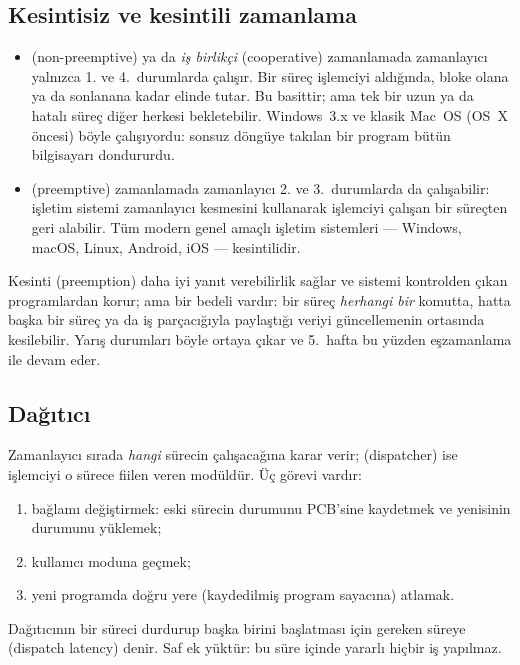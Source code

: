 \subsection{Kesintisiz ve kesintili zamanlama}

\begin{itemize}
  \item {} (non-preemptive) ya da \emph{iş birlikçi} (cooperative) zamanlamada zamanlayıcı yalnızca 1. ve 4.~durumlarda çalışır. Bir süreç işlemciyi aldığında, bloke olana ya da sonlanana kadar elinde tutar. Bu basittir; ama tek bir uzun ya da hatalı süreç diğer herkesi bekletebilir. Windows~3.x ve klasik Mac~OS (OS~X öncesi) böyle çalışıyordu: sonsuz döngüye takılan bir program bütün bilgisayarı dondururdu.
  \item {} (preemptive) zamanlamada zamanlayıcı 2. ve 3.~durumlarda da çalışabilir: işletim sistemi zamanlayıcı kesmesini kullanarak işlemciyi çalışan bir süreçten geri alabilir. Tüm modern genel amaçlı işletim sistemleri --- Windows, macOS, Linux, Android, iOS --- kesintilidir.
\end{itemize}

Kesinti (preemption) daha iyi yanıt verebilirlik sağlar ve sistemi kontrolden çıkan programlardan korur; ama bir bedeli vardır: bir süreç \emph{herhangi bir} komutta, hatta başka bir süreç ya da iş parçacığıyla paylaştığı veriyi güncellemenin ortasında kesilebilir. Yarış durumları böyle ortaya çıkar ve 5.~hafta bu yüzden eşzamanlama ile devam eder.

\subsection{Dağıtıcı}

Zamanlayıcı sırada \emph{hangi} sürecin çalışacağına karar verir;  (dispatcher) ise işlemciyi o sürece fiilen veren modüldür. Üç görevi vardır:
\begin{enumerate}[leftmargin=1.4em]
  \item bağlamı değiştirmek: eski sürecin durumunu PCB'sine kaydetmek ve yenisinin durumunu yüklemek;
  \item kullanıcı moduna geçmek;
  \item yeni programda doğru yere (kaydedilmiş program sayacına) atlamak.
\end{enumerate}

Dağıtıcının bir süreci durdurup başka birini başlatması için gereken süreye  (dispatch latency) denir. Saf ek yüktür: bu süre içinde yararlı hiçbir iş yapılmaz.

